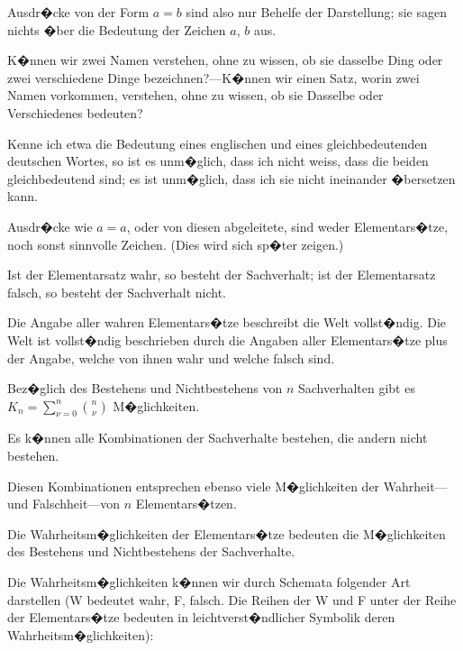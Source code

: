 \begin{propositions}
{Ausdr�cke von der Form \glqq{}$a = b$\grqq{} sind also nur
Behelfe der Darstellung; sie sagen nichts �ber die
Bedeutung der Zeichen \glqq{}$a$\grqq{}, \glqq{}$b$\grqq{} aus.}


{K�nnen wir zwei Namen verstehen, ohne zu
wissen, ob sie dasselbe Ding oder zwei verschiedene
Dinge bezeichnen?---K�nnen wir einen Satz,
worin zwei Namen vorkommen, verstehen, ohne
zu wissen, ob sie Dasselbe oder Verschiedenes
bedeuten?

Kenne ich etwa die Bedeutung eines englischen
und eines gleichbedeutenden deutschen Wortes, so
ist es unm�glich, dass ich nicht weiss, dass die
beiden gleichbedeutend sind; es ist unm�glich,
dass ich sie nicht ineinander �bersetzen kann.

Ausdr�cke wie \glqq{}$a = a$\grqq{}, oder von diesen abgeleitete,
sind weder Elementars�tze, noch sonst sinnvolle
Zeichen. (Dies wird sich sp�ter zeigen.)}


{Ist der Elementarsatz wahr, so besteht der
Sachverhalt; ist der Elementarsatz falsch, so besteht
der Sachverhalt nicht.}


{Die Angabe aller wahren Elementars�tze beschreibt
die Welt vollst�ndig. Die Welt ist
vollst�ndig beschrieben durch die Angaben aller
Elementars�tze plus der Angabe, welche von ihnen
wahr und welche falsch sind.}


{Bez�glich des Bestehens und Nichtbestehens von
\enlargethispage{9pt} %
$n$ Sachverhalten gibt es $K_{n} = \sum\limits_{\nu = 0}^n\binom{n}{\nu}$ M�glichkeiten.

Es k�nnen alle Kombinationen der Sachverhalte
bestehen, die andern nicht bestehen.}


{Diesen Kombinationen entsprechen ebenso viele
M�glichkeiten der Wahr\-heit---und Falschheit---von
$n$ Elementars�tzen.}


{Die Wahrheitsm�glichkeiten der Elementars�tze
bedeuten die M�glichkeiten des Bestehens und
Nichtbestehens der Sachverhalte.}


{Die Wahrheitsm�glichkeiten k�nnen wir durch
Schemata folgender Art darstellen (\glqq{}W\grqq{} bedeutet
\glqq{}wahr\grqq{}, \glqq{}F\grqq{}, \glqq{}falsch\grqq{}. Die Reihen der \glqq{}W\grqq{} und
\glqq{}F\grqq{} unter der Reihe der Elementars�tze bedeuten
in leichtverst�ndlicher Symbolik deren Wahrheitsm�glichkeiten):

}
\end{propositions}
